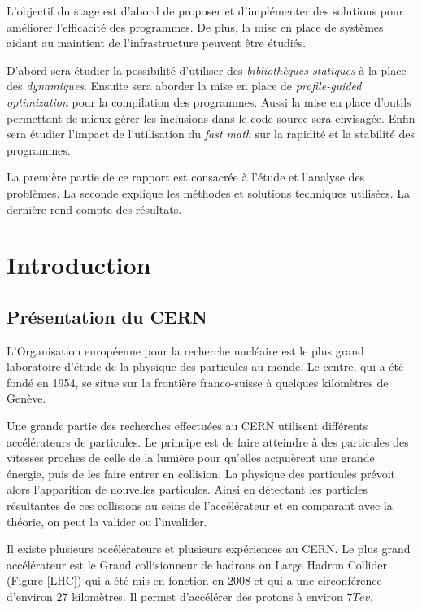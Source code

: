 \documentclass[a4paper]{report}
\begin{document}
L'objectif du stage est d'abord de proposer et d'implémenter des solutions pour améliorer l'efficacité des programmes.
De plus, la mise en place de systèmes aidant au maintient de l'infrastructure peuvent être étudiés.

D'abord sera étudier la possibilité d'utiliser des \emph{bibliothèques statiques} à la place des \emph{dynamiques}.
Ensuite sera aborder la mise en place de \emph{profile-guided optimization} pour la compilation des programmes.
Aussi la mise en place d'outils permettant de mieux gérer les inclusions dans le code source sera envisagée.
Enfin sera étudier l'impact de l'utilisation du \emph{fast math} sur la rapidité et la stabilité des programmes.

La première partie de ce rapport est consacrée à l'étude et l'analyse des problèmes.
La seconde explique les méthodes et solutions techniques utilisées.
La dernière rend compte des résultats.


\chapter{Introduction}
\section{Présentation du CERN}
L'Organisation européenne pour la recherche nucléaire est le plus grand laboratoire d'étude de la physique des particules au monde.
Le centre, qui a été fondé en 1954, se situe sur la frontière franco-suisse à quelques kilomètres de Genève.

Une grande partie des recherches effectuées au CERN utilisent différents accélérateurs de particules.
Le principe est de faire atteindre à des particules des vitesses proches de celle de la lumière pour qu'elles acquièrent une grande énergie, puis de les faire entrer en collision.
La physique des particules prévoit alors l'apparition de nouvelles particules.
Ainsi en détectant les particles résultantes de ces collisions au seins de l'accélérateur et en comparant avec la théorie, on peut la valider ou l'invalider.

Il existe plusieurs accélérateurs et plusieurs expériences au CERN.
Le plus grand accélérateur est le Grand collisionneur de hadrons ou Large Hadron Collider (Figure \ref{LHC}) qui a été mis en fonction en 2008 et qui a une circonférence d'environ 27 kilomètres.
Il permet d'accélérer des protons à environ $7 Tev$.
\end{document}
